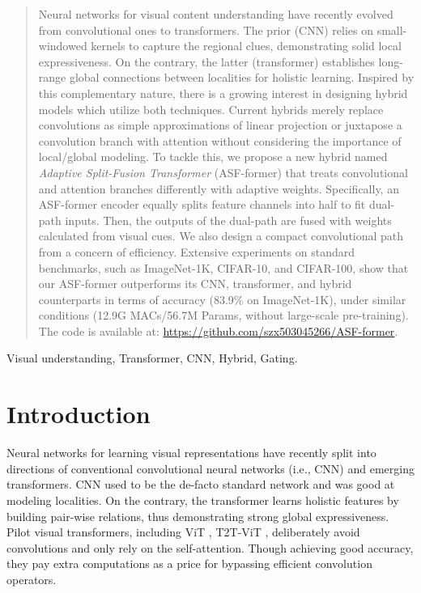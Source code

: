\documentclass[lettersize,journal]{IEEEtran}
\begin{document}
\begin{abstract}
Neural networks for visual content understanding have recently evolved from convolutional ones to transformers. The prior (CNN) relies on small-windowed kernels to capture the regional clues, demonstrating solid local expressiveness. On the contrary, the latter (transformer) establishes long-range global connections between localities for holistic learning. Inspired by this complementary nature, there is a growing interest in designing hybrid models which utilize both techniques. 
Current hybrids merely replace convolutions as simple approximations of linear projection or juxtapose a convolution branch with attention without considering the importance of local/global modeling. To tackle this, we propose a new hybrid named \textit{Adaptive Split-Fusion Transformer} (ASF-former) that treats convolutional and attention branches differently with adaptive weights. Specifically, an ASF-former encoder equally splits feature channels into half to fit dual-path inputs. Then, the outputs of the dual-path are fused with weights calculated from visual 
cues. We also design a compact convolutional path from a concern of efficiency. Extensive experiments on standard benchmarks, such as ImageNet-1K, CIFAR-10, and CIFAR-100, show that our ASF-former outperforms its CNN, transformer, and hybrid counterparts in terms of accuracy (83.9\% on ImageNet-1K), under similar conditions (12.9G MACs/56.7M Params, without large-scale pre-training). The code is available at: \url{https://github.com/szx503045266/ASF-former}.
\end{abstract}

\begin{IEEEkeywords}
Visual understanding, Transformer, CNN, Hybrid, Gating.
\end{IEEEkeywords}


\section{Introduction}

Neural networks for learning visual representations have recently split into directions of conventional convolutional neural networks (i.e., CNN) and emerging transformers. CNN used to be the de-facto standard network and was good at modeling localities. On the contrary, the transformer learns holistic features by building pair-wise relations, thus demonstrating strong global expressiveness. Pilot visual transformers, including ViT \cite{dosovitskiy2021an}, T2T-ViT \cite{yuan2021tokens}, deliberately avoid convolutions and only rely on the self-attention. Though achieving good accuracy, they pay extra computations as a price for bypassing efficient convolution operators. 
\end{document}
